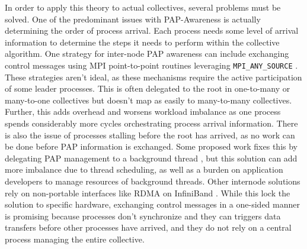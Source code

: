 In order to apply this theory to actual collectives, several problems must be solved.
One of the predominant issues with PAP-Awareness is actually determining the order of process arrival.
Each process needs some level of arrival information to determine the steps it needs to perform within the collective algorithm. 
One strategy for inter-node PAP awareness can include exchanging control messages using MPI point-to-point routines leveraging \texttt{MPI\_ANY\_SOURCE} \cite{Patarasuk2008EffBcastDifProcArr}.
These strategies aren't ideal, as these mechanisms require the active participation of some leader processes.
This is often delegated to the root in one-to-many or many-to-one collectives but doesn't map as easily to many-to-many collectives.
Further, this adds overhead and worsens workload imbalance as one process spends considerably more cycles orchestrating process arrival information.
There is also the issue of processes stalling before the root has arrived, as no work can be done before PAP information is exchanged.
Some proposed work fixes this by delegating PAP management to a background thread \cite{Proficz2018ImprvAllReduceForImbPAP, Proficz2020PAPAwareScatterGather, Proficz2021AllGatherResilientToImbPAP, Faraj2008StudyProcArrivalMPIColl}, but this solution can add more imbalance due to thread scheduling, as well as a burden on application developers to manage resources of background threads.
Other internode solutions rely on non-portable interfaces like RDMA on InfiniBand \cite{Qian2009ProcArrivalSHMA2AIB}.
While this lock the solution to specific hardware, exchanging control messages in a one-sided manner is promising because processes don't synchronize and they can triggers data transfers before other processes have arrived, and they do not rely on a central process managing the entire collective. 

